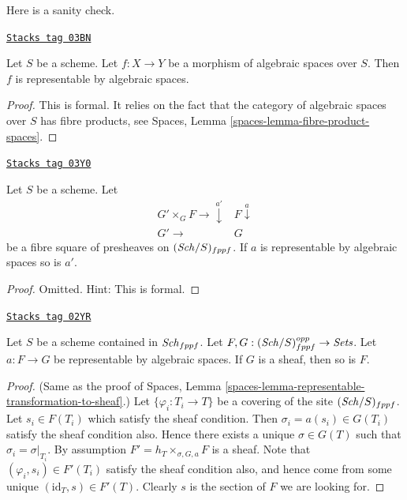 Here is a sanity check.

\begin{lemma}
\label{bootstrap-lemma-morphism-spaces-is-representable-by-spaces}
\href{https://stacks.math.columbia.edu/tag/03BN}{\texttt{Stacks tag 03BN}}

Let $S$ be a scheme.
Let $f : X \to Y$ be a morphism of algebraic spaces over $S$.
Then $f$ is representable by algebraic spaces.
\end{lemma}

\begin{proof}
This is formal. It relies on the fact that
the category of algebraic spaces over $S$ has fibre products, see
Spaces, Lemma \ref{spaces-lemma-fibre-product-spaces}.
\end{proof}

\begin{lemma}
\label{bootstrap-lemma-base-change-transformation}
\href{https://stacks.math.columbia.edu/tag/03Y0}{\texttt{Stacks tag 03Y0}}


Let $S$ be a scheme. Let
$$
\begin{array}{cc}G' \times_G F \longrightarrow\overset{a'}{\downarrow} & F \overset{a}{\downarrow} \\ G' \longrightarrow & G\end{array}
$$
be a fibre square of presheaves on $(\mathit{Sch}/S)_{fppf}$.
If $a$ is representable by algebraic spaces so is $a'$.
\end{lemma}

\begin{proof}
Omitted. Hint: This is formal.
\end{proof}

\begin{lemma}
\label{bootstrap-lemma-representable-by-spaces-transformation-to-sheaf}
\href{https://stacks.math.columbia.edu/tag/02YR}{\texttt{Stacks tag 02YR}}

Let $S$ be a scheme contained in $\mathit{Sch}_{fppf}$.
Let $F, G : (\mathit{Sch}/S)_{fppf}^{opp} \to \textit{Sets}$.
Let $a : F \to G$ be representable by algebraic spaces.
If $G$ is a sheaf, then so is $F$.
\end{lemma}

\begin{proof}
(Same as the proof of
Spaces, Lemma \ref{spaces-lemma-representable-transformation-to-sheaf}.)
Let $\{\varphi_i : T_i \to T\}$ be a covering of the site
$(\mathit{Sch}/S)_{fppf}$.
Let $s_i \in F(T_i)$ which satisfy the sheaf condition.
Then $\sigma_i = a(s_i) \in G(T_i)$ satisfy the sheaf condition
also. Hence there exists a unique $\sigma \in G(T)$ such
that $\sigma_i = \sigma|_{T_i}$. By assumption
$F' = h_T \times_{\sigma, G, a} F$ is a sheaf.
Note that $(\varphi_i, s_i) \in F'(T_i)$ satisfy the
sheaf condition also, and hence come from some unique
$(\text{id}_T, s) \in F'(T)$. Clearly $s$ is the section of
$F$ we are looking for.
\end{proof}


